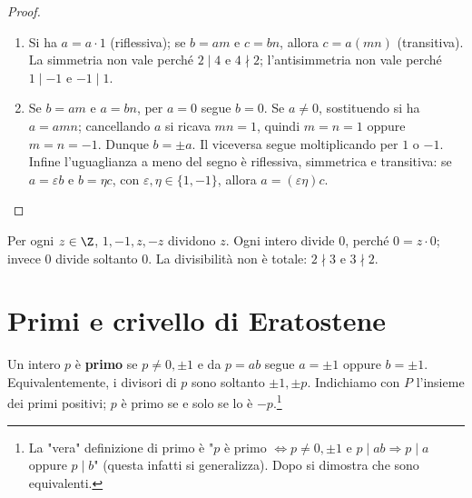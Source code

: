 \begin{proof}
\begin{enumerate}[label=\arabic*.]
\item Si ha $a=a\cdot1$ (riflessiva); se $b=am$ e $c=bn$, allora $c=a(mn)$ (transitiva). La simmetria non vale perché $2\mid4$ e $4\nmid2$; l'antisimmetria non vale perché $1\mid-1$ e $-1\mid1$.
\item Se $b=am$ e $a=bn$, per $a=0$ segue $b=0$. Se $a\ne0$, sostituendo si ha $a=amn$; cancellando $a$ si ricava $mn=1$, quindi $m=n=1$ oppure $m=n=-1$. Dunque $b=\pm a$. Il viceversa segue moltiplicando per $1$ o $-1$. Infine l'uguaglianza a meno del segno è riflessiva, simmetrica e transitiva: se $a=\varepsilon b$ e $b=\eta c$, con $\varepsilon,\eta\in\{1,-1\}$, allora $a=(\varepsilon\eta)c$.
\end{enumerate}
\end{proof}

\begin{osservazione}
Per ogni $z\in\Z$, $1,-1,z,-z$ dividono $z$. Ogni intero divide $0$, perché $0=z\cdot0$; invece $0$ divide soltanto $0$. La divisibilità non è totale: $2\nmid3$ e $3\nmid2$.
\end{osservazione}

\section{Primi e crivello di Eratostene}
\begin{definizione}
Un intero $p$ è \textbf{primo} se $p\ne0,\pm1$ e da $p=ab$ segue $a=\pm1$ oppure $b=\pm1$. Equivalentemente, i divisori di $p$ sono soltanto $\pm1,\pm p$. Indichiamo con $P$ l'insieme dei primi positivi; $p$ è primo se e solo se lo è $-p$.\footnote{La "vera" definizione di primo è "$p$ è primo $\iff p\ne0,\pm1$ e $p\mid ab\Rightarrow p\mid a$ oppure $p\mid b$" (questa infatti si generalizza). Dopo si dimostra che sono equivalenti.}
\end{definizione}

